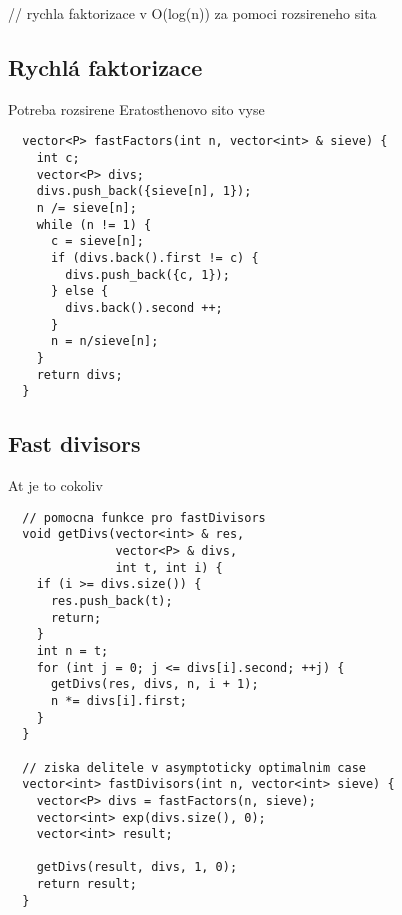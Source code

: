 \documentclass{article}
\begin{document}
// rychla faktorizace v O(log(n)) za pomoci rozsireneho sita
\subsection{Rychlá faktorizace}
Potreba rozsirene Eratosthenovo sito vyse
\begin{lstlisting}
  vector<P> fastFactors(int n, vector<int> & sieve) {
    int c;
    vector<P> divs;
    divs.push_back({sieve[n], 1});
    n /= sieve[n];
    while (n != 1) {
      c = sieve[n];
      if (divs.back().first != c) {
        divs.push_back({c, 1});
      } else {
        divs.back().second ++;
      }
      n = n/sieve[n];
    }
    return divs;
  }
\end{lstlisting}

\subsection{Fast divisors}
At je to cokoliv

\begin{lstlisting}
  // pomocna funkce pro fastDivisors
  void getDivs(vector<int> & res, 
               vector<P> & divs,
               int t, int i) {
    if (i >= divs.size()) {
      res.push_back(t);
      return;
    }
    int n = t;
    for (int j = 0; j <= divs[i].second; ++j) {
      getDivs(res, divs, n, i + 1);
      n *= divs[i].first;
    }
  }

  // ziska delitele v asymptoticky optimalnim case
  vector<int> fastDivisors(int n, vector<int> sieve) {
    vector<P> divs = fastFactors(n, sieve);
    vector<int> exp(divs.size(), 0);
    vector<int> result;

    getDivs(result, divs, 1, 0);
    return result;
  }
\end{lstlisting}
\end{document}
